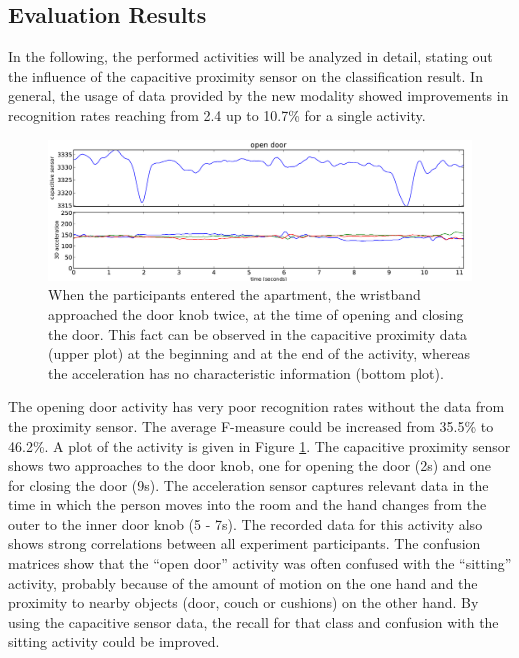 \documentclass[runningheads,a4paper]{llncs}
\begin{document}
\subsection{Evaluation Results}
\label{sect:evaluation}

In the following, the performed activities will be analyzed in detail, stating out the influence of the capacitive proximity sensor on the classification result. In general, the usage of data provided by the new modality showed improvements in recognition rates reaching from 2.4 up to 10.7\% for a single activity.

\begin{figure}[h]
	\centering
		\includegraphics[width=1.00\textwidth]{../Auswertung/images/tobias_1.pdf}
	\caption{When the participants entered the apartment, the wristband approached the door knob twice, at the time of opening and closing the door. This fact can be observed in the capacitive proximity data (upper plot) at the beginning and at the end of the activity, whereas the acceleration has no characteristic information (bottom plot).}
	\label{fig:opendoor}
\end{figure}

The opening door activity has very poor recognition rates without the data from the proximity sensor. The average F-measure could be increased from 35.5\% to 46.2\%. A plot of the activity is given in Figure \ref{fig:opendoor}. The capacitive proximity sensor shows two approaches to the door knob, one for opening the door (2s) and one for closing the door (9s). The acceleration sensor captures relevant data in the time in which the person moves into the room and the hand changes from the outer to the inner door knob (5 - 7s). The recorded data for this activity also shows strong correlations between all experiment participants. The confusion matrices show that the ``open door'' activity was often confused with the ``sitting'' activity, probably because of the amount of motion on the one hand and the proximity to nearby objects (door, couch or cushions) on the other hand. By using the capacitive sensor data, the recall for that class and confusion with the sitting activity could be improved. 
\end{document}
